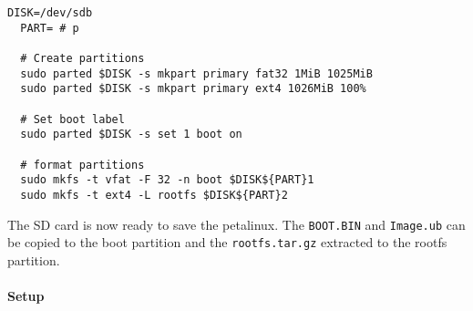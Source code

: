 \begin{lstlisting}[style=bash, caption={}, label=lst:create_partitions]
  DISK=/dev/sdb
  PART= # p

  # Create partitions
  sudo parted $DISK -s mkpart primary fat32 1MiB 1025MiB
  sudo parted $DISK -s mkpart primary ext4 1026MiB 100%

  # Set boot label
  sudo parted $DISK -s set 1 boot on

  # format partitions
  sudo mkfs -t vfat -F 32 -n boot $DISK${PART}1
  sudo mkfs -t ext4 -L rootfs $DISK${PART}2
\end{lstlisting}

The SD card is now ready to save the petalinux.
The \texttt{BOOT.BIN} and \texttt{Image.ub} can be copied to the boot partition and the \texttt{rootfs.tar.gz} extracted to the rootfs partition.

\paragraph{Setup}
